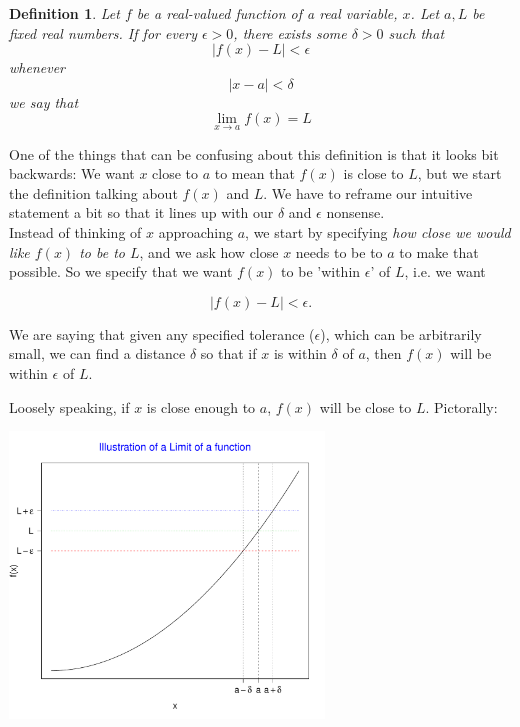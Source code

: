 \documentclass[12pt,a4paper]{article} %
\newtheorem{defn}{Definition}
\begin{document}
\begin{defn}
Let $f$ be a real-valued function of a real variable, $x$.  Let $a,L$ be fixed real numbers.  If for every $\epsilon >0$, there exists some $\delta>0$ such that
\begin{equation*}
|f(x) - L|<\epsilon 
\end{equation*}
whenever
\begin{equation*}
|x - a|<\delta 
\end{equation*}
we say that
\begin{equation*}
\lim_{x\rightarrow a} f(x) = L
\end{equation*}
\end{defn}
 One of the things that can be confusing about this definition is that it looks bit backwards: We want $x$ close to $a$ to mean that $f(x)$ is close to $L$, but we start the definition talking about $f(x)$ and $L$. We have to reframe our intuitive statement a bit so that it lines up with our $\delta$ and $\epsilon$ nonsense.\\
 
Instead of thinking of $x$ approaching $a$, we start by specifying \emph{how close we would like $f(x)$ to be to $L$}, and we ask how close $x$ needs to be to $a$ to make that possible. So we specify that we want $f(x)$ to be 'within $\epsilon$' of $L$, i.e. we want 

$$|f(x) - L| < \epsilon.$$
 
We are saying that given any specified tolerance ($\epsilon$), which can be arbitrarily small, we can find a distance $\delta$ so that if $x$ is within $\delta$ of $a$, then $f(x)$ will be within $\epsilon$ of $L$. 


Loosely speaking, if $x$ is close enough to $a$, $f(x)$ will be close to $L$.  Pictorally:

\includegraphics[height=3in]{limit.pdf}
\end{document}
